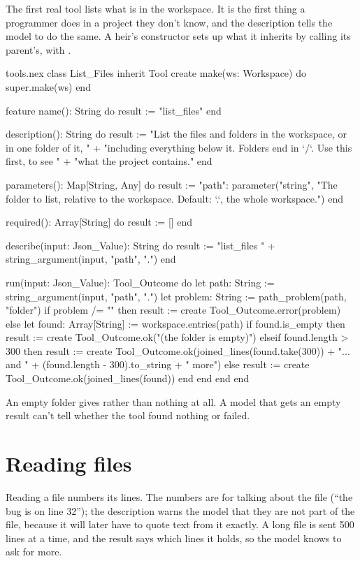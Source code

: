 The first real tool lists what is in the workspace. It is the first thing
a programmer does in a project they don't know, and the description tells
the model to do the same. A heir's constructor sets up what it inherits by
calling its parent's, with .

\begin{append}{tools.nex}
class List_Files inherit Tool
create
  make(ws: Workspace) do
    super.make(ws)
  end

feature
  name(): String do
    result := "list_files"
  end

  description(): String do
    result := "List the files and folders in the workspace, or in one folder of it, "
      + "including everything below it. Folders end in `/`. Use this first, to see "
      + "what the project contains."
  end

  parameters(): Map[String, Any] do
    result := {"path": parameter("string", "The folder to list, relative to the workspace. Default: `.`, the whole workspace.")}
  end

  required(): Array[String] do
    result := []
  end

  describe(input: Json_Value): String do
    result := "list_files " + string_argument(input, "path", ".")
  end

  run(input: Json_Value): Tool_Outcome do
    let path: String := string_argument(input, "path", ".")
    let problem: String := path_problem(path, "folder")
    if problem /= "" then
      result := create Tool_Outcome.error(problem)
    else
      let found: Array[String] := workspace.entries(path)
      if found.is_empty then
        result := create Tool_Outcome.ok("(the folder is empty)")
      elseif found.length > 300 then
        result := create Tool_Outcome.ok(joined_lines(found.take(300))
          + "... and " + (found.length - 300).to_string + " more")
      else
        result := create Tool_Outcome.ok(joined_lines(found))
      end
    end
  end
end
\end{append}

An empty folder gives  rather than nothing at
all. A model that gets an empty result can't tell whether the tool found
nothing or failed.

\section{Reading files}

Reading a file numbers its lines. The numbers are for talking about the
file (``the bug is on line 32''); the description warns the model that they
are not part of the file, because it will later have to quote text from
it exactly. A long file is sent 500 lines at a time, and the result says
which lines it holds, so the model knows to ask for more.

